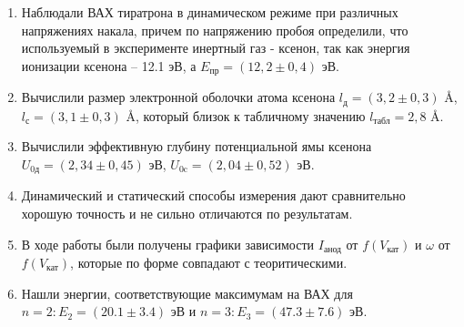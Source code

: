 \documentclass[a4paper, 12pt]{article}%
\begin{document}
\begin{enumerate}

\item Наблюдали ВАХ тиратрона в динамическом режиме при различных напряжениях накала, причем по напряжению пробоя определили, что используемый в эксперименте инертный газ - ксенон,  так как энергия ионизации ксенона -- 12.1 эВ,  а $E_\text{пр} = (12,2 \pm 0,4)$ эВ. 

\item Вычислили размер электронной оболочки атома ксенона $l_{\text{д}} = (3,2 \pm 0,3)  \text{ \AA}$, $l_{\text{с}} = (3,1 \pm 0,3)  \text{ \AA}$,  который близок к табличному значению $l_\text{табл} = 2,8 \text{ \AA}$. 

\item Вычислили эффективную глубину потенциальной ямы ксенона $U_{0\text{д}} = (2,34 \pm 0,45)$ эВ,  $U_{0\text{c}} = (2,04 \pm 0,52)$ эВ.

\item Динамический и статический способы измерения дают сравнительно хорошую точность и не сильно отличаются по результатам.

\item В ходе работы были получены графики зависимости $I_{\text{анод}}$ от $f(V_{\text{кат}})$ и $\omega$ от $f(V_{\text{кат}})$,  которые по форме совпадают с теоритическими.

\item Нашли энергии,  соответствующие максимумам на ВАХ для $n = 2 : E_2 = (20.1 \pm 3.4) \text{ эВ}$ и $n = 3 : E_3 = (47.3 \pm 7.6) \text{ эВ}$. 

\end{enumerate}
\end{document}
